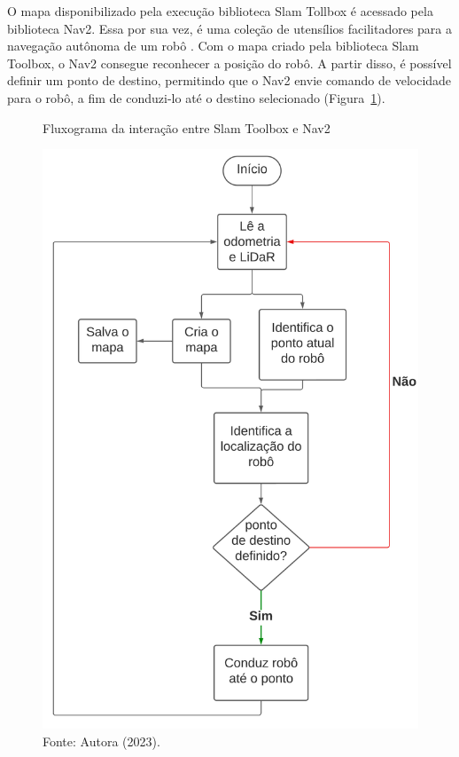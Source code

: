 O mapa disponibilizado pela execução biblioteca Slam Tollbox é acessado pela biblioteca Nav2. Essa por sua vez, é uma coleção de utensílios facilitadores para a navegação autônoma de um robô \cite{nav2}. Com o mapa criado pela biblioteca Slam Toolbox, o Nav2 consegue reconhecer a posição do robô. A partir disso, é possível definir um ponto de destino, permitindo que o Nav2  envie comando de velocidade  para o robô, a fim de conduzi-lo até o destino selecionado (Figura~\ref{fig:fluxogramaComando}).

\begin{figure}[h]
    \centering
    \caption{Fluxograma da interação entre Slam Toolbox e Nav2}
    \includegraphics[scale=0.5]{fluxogramaComando.png}
   
    \caption*{Fonte: Autora (2023).}
    \label{fig:fluxogramaComando}
\end{figure}

